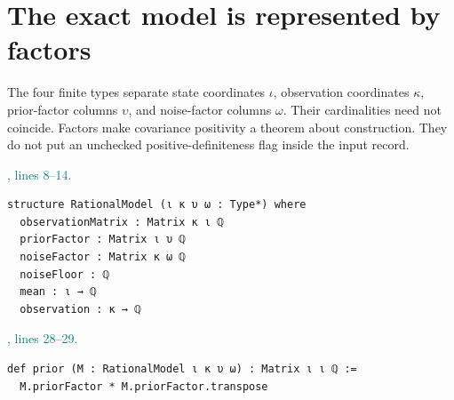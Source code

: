 \documentclass[11pt]{article}\usepackage{needspace}\renewcommand{\paperkind}{Lean companion}\setlength{\parskip}{0.35em}
\begin{document}
\section{The exact model is represented by factors}

The four finite types separate state coordinates $\iota$, observation coordinates $\kappa$, prior-factor columns $\upsilon$, and noise-factor columns $\omega$. Their cardinalities need not coincide. Factors make covariance positivity a theorem about construction. They do not put an unchecked positive-definiteness flag inside the input record.



{\small\textcolor{teal}{, lines 8--14.}\par}

\begin{lstlisting}[style=BayesSource]
structure RationalModel (ι κ υ ω : Type*) where
  observationMatrix : Matrix κ ι ℚ
  priorFactor : Matrix ι υ ℚ
  noiseFactor : Matrix κ ω ℚ
  noiseFloor : ℚ
  mean : ι → ℚ
  observation : κ → ℚ
\end{lstlisting}



{\small\textcolor{teal}{, lines 28--29.}\par}

\begin{lstlisting}[style=BayesSource]
def prior (M : RationalModel ι κ υ ω) : Matrix ι ι ℚ :=
  M.priorFactor * M.priorFactor.transpose
\end{lstlisting}


\end{document}
